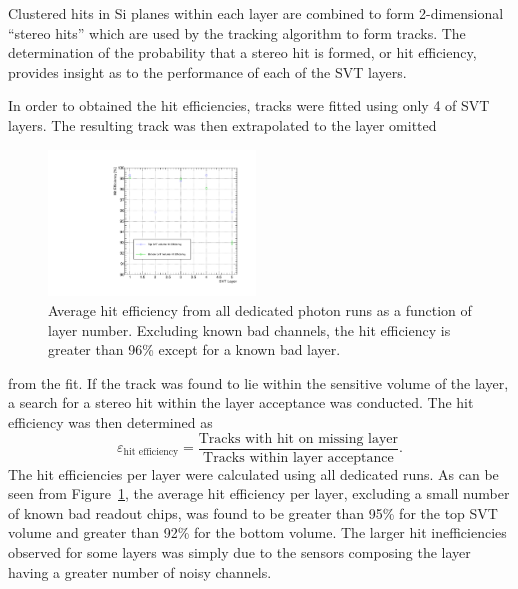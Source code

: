 
%
%
 
Clustered hits in Si planes within each layer are combined to form
2-dimensional ``stereo hits'' which are used by the tracking algorithm to 
form tracks.  The determination of the probability that a stereo hit is 
formed, or hit efficiency, provides insight as to the performance of each of 
the SVT layers.

In order to obtained the hit efficiencies, tracks were fitted using only 4 of 
SVT layers. The resulting track was then extrapolated to the layer omitted
\begin{figure}[h]
    	\includegraphics[width=0.49\textwidth]{test2012/svtperformance/trk_performance/hit_efficiency_vs_layer.pdf}
        \caption{{\small
                    Average hit efficiency
                    from all dedicated photon runs as a function of layer
                    number.  Excluding known bad channels, the hit efficiency
                    is greater than 96\% except for a known bad layer.
                                    }} 
	\label{fig:hit_track_efficiency}
\end{figure}
from the fit. If the track was found to lie within the sensitive volume
of the layer, a search for a stereo hit within the layer acceptance was 
conducted.  The hit efficiency was then determined as
\[
    \varepsilon_{\mbox{hit efficiency}} = \frac{\mbox{Tracks with hit on missing layer}}
                                            {\mbox{Tracks within layer acceptance}}.
\]
The hit efficiencies per layer were calculated using all dedicated runs. As 
can be seen from Figure~\ref{fig:hit_track_efficiency}, the average hit efficiency
per layer, excluding a small number of known bad readout chips, was found to be greater than
95\% for the top SVT volume and greater than 92\% for the bottom volume.  The 
larger hit inefficiencies observed for some layers was simply due to the 
sensors composing the layer having a greater number of noisy channels.

